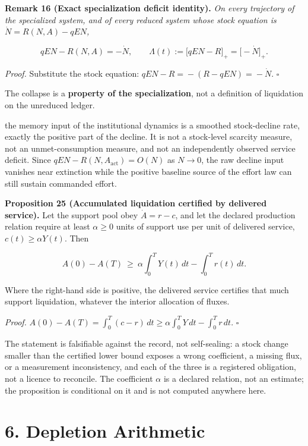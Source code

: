 \documentclass[11pt]{article}
\begin{document}
\textbf{Remark 16 (Exact specialization deficit identity).} \emph{On every trajectory of the specialized system, and of every reduced system whose stock equation is \(\dot N = R(N,A) - qEN\),} 

$$qEN - R(N,A) = -\dot N, \qquad \Lambda(t) := \bigl[ qEN - R \bigr]_+ = \bigl[ -\dot N \bigr]_+.$$



\emph{Proof.} Substitute the stock equation: \(qEN - R =\allowbreak{} -(R - qEN) =\allowbreak{} -\dot N\). \(\square\)

The collapse is a \textbf{property of the specialization}, not a definition of liquidation on the unreduced ledger.

the memory input of the institutional dynamics is a smoothed stock-decline rate, exactly the positive part of the decline. It is not a stock-level scarcity measure, not an unmet-consumption measure, and not an independently observed service deficit. Since \(qEN-R(N,\allowbreak{}A_{\mathrm{act}})=\allowbreak{}O(N)\) as \(N\to0\), the raw decline input vanishes near extinction while the positive baseline source of the effort law can still sustain commanded effort.

\textbf{Proposition 25 (Accumulated liquidation certified by delivered service).} Let the support pool obey \(\dot A=r-c\), and let the declared production relation require at least \(\alpha\ge0\) units of support use per unit of delivered service, \(c(t)\ge\alpha Y(t)\). Then 

$$A(0)-A(T)\ \ge\ \alpha\int_0^TY(t)\,dt-\int_0^Tr(t)\,dt .$$

 Where the right-hand side is positive, the delivered service certifies that much support liquidation, whatever the interior allocation of fluxes.

\emph{Proof.} \(A(0)-A(T)=\allowbreak{}\int_0^T(c-r)\,\allowbreak{}dt\ge\alpha\int_0^TY\,\allowbreak{}dt-\int_0^Tr\,\allowbreak{}dt\). \(\square\)

The statement is falsifiable against the record, not self-sealing: a stock change smaller than the certified lower bound exposes a wrong coefficient, a missing flux, or a measurement inconsistency, and each of the three is a registered obligation, not a licence to reconcile. The coefficient \(\alpha\) is a declared relation, not an estimate; the proposition is conditional on it and is not computed anywhere here.

\vspace{0.8em}

\section*{6. Depletion Arithmetic}\label{6-depletion-arithmetic}
\end{document}
